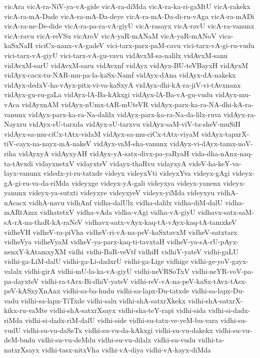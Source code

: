 {vicAra
vicA-ra-NiV-ya-vA-gide
vicA-ra-diMda
vicA-ra-ka-ri-gaMtU
vicA-rakekx
vicA-ra-mA-Dade
vicA-ra-mA-Da-deye
vicA-ra-mA-Da-di-ru-vAga
vicA-ra-mADi
vicA-ra-ne-De-dide
vicA-ra-pa-ra-vA-giyU
vicA-rasayx
vicA-ravU
vicA-ra-vanunx
vicA-ravu
vicA-reVSu
vicAroV
vicA-yaR-mANaM
vicA-yaR-mANoV
vica-kaSxNaH
viciCx-nanx-vA-gadeV
vici-tarx-parx-paM-cavu
vici-tarx-vA-gi-ru-vudu
vici-tarx-vA-giyU
vici-tarx-vA-gu-vavu
vidAvxM-sa-nalilx
vidAvxM-sanu
vidAvxM-sarU
vidAvxM-saru
vidAvxnf
vidAyx
vidAyx-BU-teVBayxH
vidAyxM
vidAyx-cacx-tu-NAR-mu-pa-la-kaSx-Namf
vidAyx-dAna
vidAyx-dA-nakekx
vidAyx-dedxV-ha-vAyx-pitx-vi-va-kaSxyA
vidAyx-dhi-kA-ra-jiV-vi-tAvxnanx
vidAyx-gu-ru-gaLa
vidAyx-lA-Ba-kAkxgi
vidAyx-lA-Ba-vA-gu-vudu
vidAyx-mu-vAca
vidAyxnAM
vidAyx-nUmx-tAR-mUteVR
vidAyx-parx-ka-ra-NA-dhi-kA-ra-vanunx
vidAyx-parx-ka-ra-Na-dalilx
vidAyx-parx-ka-ra-Na-da-lilx-ruva
vidAyx-ra-Nayxru
vidAyx-sU-tarxda
vidAyx-sU-tarxvu
vidAyx-saM-viV-ta-sheV-muSiH
vidAyx-sa-mu-ciCx-tAtx-vidaM
vidAyx-sa-mu-ciCx-tAtx-viyaM
vidAyx-tapxrX-tiV-cayx-na-nayx-mA-nakeV
vidAyx-vaM-sha-vanunx
vidAyx-vi-dAyx-tamx-noV-riha
vidAyxyA
vidAyxyAH
vidAyx-yA-satx-divx-pa-yaRyaH
vida-dha-nAnx-naq-ta-tAvxdi
vidayxnetxV
vidayxteV
vidayx-thaRvu
vidayxyA
videV-ha-keY-va-layx-vanunx
videdx-yi-ru-tatxde
videyx
videyxVti
videyxYva
videyx-gAgi
videyx-gA-gi-ru-va-da-riMda
videyxge
videyx-yA-gali
videyxya
videyx-yanenx
videyx-yanunx
videyx-ya-sutxti
videyxye
videyxyeV
videyx-yiMda
videyxyu
vidhA-nAcacx
vidhA-navu
vidhAnf
vidha-dalUlx
vidha-dalilx
vidha-diM-dalU
vidha-mARtAmx
vidhatetxV
vidha-vAda
vidha-vAgi
vidha-vA-giyU
vidhavx-satx-saM-sA-rA-na-thaR-kA-raNeV
vidhavx-satx-vAyx-kaq-tA-vAyx-kaq-tA-tamxkeV
vidheVH
vidheV-ra-piVha
vidheV-ri-vA-na-peV-kaSxtavxM
vidheV-satxtarx
vidheVya
vidheVyaM
vidheV-ya-parx-kaq-ti-tavxtaH
vidheV-ya-sA-rU-pAyx-nenxY-kAtamxyXM
vidhi
vidhi-BaR-veVtf
vidhiH
vidhiV-yateV
vidhi-gaLU
vidhi-ga-LiM-dalU
vidhi-ga-Li-dadxrU
vidhi-ga-Lige
vidhige
vidhi-ge-yoV-gayx-valalx
vidhi-girA
vidhi-mU-la-ka-vA-giyU
vidhi-neVRSoTxV
vidhi-neYR-voV-pa-pa-dayxteV
vidhi-ra-tArx-Bi-dhiV-yateV
vidhi-reV-vA-na-peV-kaSx-tAvx-tAsx-peV-kASxyXnAnx
vidhi-sa-ba-hudu
vidhi-sa-lapx-Du-tatxde
vidhi-sa-lapx-Du-vadu
vidhi-sa-lapx-TiTxde
vidhi-salu
vidhi-shA-satxrXkekx
vidhi-shA-satxrX-kikx-ru-vaMte
vidhi-shA-satxrXsayx
vidhi-sha-teY-rapi
vidhi-sida
vidhi-si-dadx-riMda
vidhi-si-dadx-riM-dalU
vidhi-side
vidhi-su-tatx-ve-yeM-bu-vara
vidhi-su-vudU
vidhi-su-vu-daSeTx
vidhi-su-vu-da-kAkxgi
vidhi-su-vu-dakekx
vidhi-su-vu-deM-budu
vidhi-su-vu-deMdu
vidhi-su-vu-dilalx
vidhi-su-vudu
vidhi-ta-natxrXsayx
vidhi-tasx-nitxVha
vidhi-vA-diya
vidhi-vA-kayx-diMda
}
